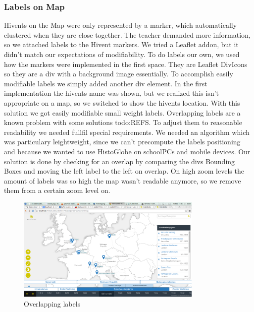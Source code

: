 \subsubsection{Labels on Map}
Hivents on the Map were only represented by a marker, which automatically clustered when they are close together.
The teacher demanded more information, so we attached labels to the Hivent markers.
We tried a Leaflet addon, but it didn't match our expectations of modifiability.
To do labels our own, we used how the markers were implemented in the first space. They are Leaflet DivIcons so they are a div with a background image essentially. To accomplish easily modifiable labels we simply added another div element.
In the first implementation the hivents name was shown, but we realized this isn't appropriate on a map, so we switched to show the hivents location. With this solution we got easily modifiable small weight labels.
Overlapping labels are a known problem with some solutions todo:REFS.
To adjust them to reasonable readability we needed fullfil special requirements.
We needed an algorithm which was particulary leightweight, since we can't precompute the labels positioning and because we wanted to use HistoGlobe on schoolPCs and mobile devices.
Our solution is done by checking for an overlap by comparing the divs Bounding Boxes and moving the left label to the left on overlap.
On high zoom levels the amount of labels was so high the map wasn't readable anymore, so we remove them from a certain zoom level on.

  \begin{figure}[here]
\begin{center}
  \includegraphics[width=0.8\textwidth]{graphics/overlapping_labels.png}
  \end{center}

  \caption{Overlapping labels}
  \label{fig:overlapping_labels}
  \end{figure}

